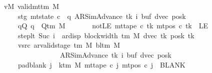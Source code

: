 \begin{isabellebody}
\ \ \ vM{\isacharcolon}{\kern0pt}\ {\isachardoublequoteopen}valid{\isacharunderscore}{\kern0pt}mttm\ M{\isachardoublequoteclose}\isanewline
\ \ \ \ \ \ \ stg{\isacharcolon}{\kern0pt}\ {\isachardoublequoteopen}mt{\isacharunderscore}{\kern0pt}state\ c{\isacharprime}{\kern0pt}\ {\isacharequal}{\kern0pt}\ {\isacharparenleft}{\kern0pt}q{\isacharcomma}{\kern0pt}\ AR{\isacharunderscore}{\kern0pt}SimAdvance{\isacharcomma}{\kern0pt}\ tk{\isacharcomma}{\kern0pt}\ i{\isacharcomma}{\kern0pt}\ buf{\isacharcomma}{\kern0pt}\ dvec{\isacharcomma}{\kern0pt}\ posk{\isacharparenright}{\kern0pt}{\isachardoublequoteclose}\isanewline
\ \ \ \ \ \ \ qQ{\isacharcolon}{\kern0pt}\ {\isachardoublequoteopen}q\ {\isasymin}\ Q{\isacharunderscore}{\kern0pt}tm\ M{\isachardoublequoteclose}\isanewline
\ \ \ \ \ \ \ notLE{\isacharcolon}{\kern0pt}\ {\isachardoublequoteopen}mt{\isacharunderscore}{\kern0pt}tape\ c{\isacharprime}{\kern0pt}\ tk\ {\isacharparenleft}{\kern0pt}mt{\isacharunderscore}{\kern0pt}pos\ c{\isacharprime}{\kern0pt}\ tk{\isacharparenright}{\kern0pt}\ {\isasymnoteq}\ LE{}{\isachardoublequoteclose}\isanewline
\ \ \ \ \ \ \ step{\isacharunderscore}{\kern0pt}lt{\isacharcolon}{\kern0pt}\ {\isachardoublequoteopen}Suc\ i\ {\isacharless}{\kern0pt}\ ar{\isacharunderscore}{\kern0pt}disp\ {\isacharparenleft}{\kern0pt}block{\isacharunderscore}{\kern0pt}width\ {\isacharparenleft}{\kern0pt}{\isasymGamma}{\isacharunderscore}{\kern0pt}tm\ M{\isacharparenright}{\kern0pt}{\isacharparenright}{\kern0pt}\ {\isacharparenleft}{\kern0pt}dvec\ tk{\isacharparenright}{\kern0pt}\ {\isacharparenleft}{\kern0pt}posk\ tk{\isacharparenright}{\kern0pt}{\isachardoublequoteclose}\isanewline
\ \ \ \ \ \ \ vsrc{\isacharcolon}{\kern0pt}\ {\isachardoublequoteopen}ar{\isacharunderscore}{\kern0pt}valid{\isacharunderscore}{\kern0pt}stage\ {\isacharparenleft}{\kern0pt}{\isasymGamma}{\isacharunderscore}{\kern0pt}tm\ M{\isacharparenright}{\kern0pt}\ {\isacharparenleft}{\kern0pt}bl{\isacharunderscore}{\kern0pt}tm\ M{\isacharparenright}{\kern0pt}\isanewline
\ \ \ \ \ \ \ \ \ \ \ \ \ \ \ \ \ \ \ {\isacharparenleft}{\kern0pt}AR{\isacharunderscore}{\kern0pt}SimAdvance{\isacharcomma}{\kern0pt}\ tk{\isacharcomma}{\kern0pt}\ i{\isacharcomma}{\kern0pt}\ buf{\isacharcomma}{\kern0pt}\ dvec{\isacharcomma}{\kern0pt}\ posk{\isacharparenright}{\kern0pt}{\isachardoublequoteclose}\isanewline
\ \ \ \ \ \ \ pad{\isacharunderscore}{\kern0pt}blank{\isacharcolon}{\kern0pt}\ {\isachardoublequoteopen}{\isasymforall}j\ {\isasymge}\ k{\isacharunderscore}{\kern0pt}tm\ M{\isachardot}{\kern0pt}\ mt{\isacharunderscore}{\kern0pt}tape\ c{\isacharprime}{\kern0pt}\ j\ {\isacharparenleft}{\kern0pt}mt{\isacharunderscore}{\kern0pt}pos\ c{\isacharprime}{\kern0pt}\ j{\isacharparenright}{\kern0pt}\ {\isacharequal}{\kern0pt}\ BLANK{}{\isachardoublequoteclose}\isanewline

\end{isabellebody}
